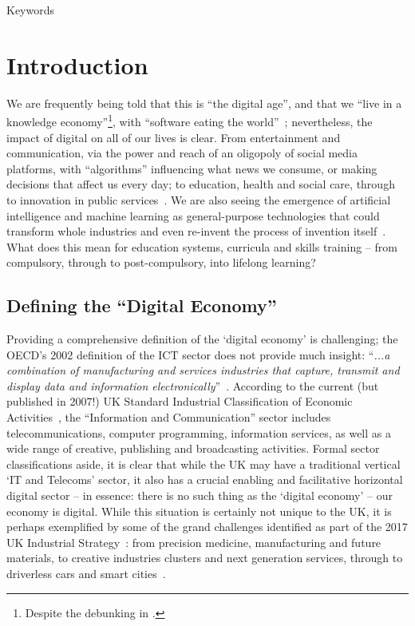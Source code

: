 \documentclass[conference]{IEEEtran}
\begin{document}
\begin{IEEEkeywords}
Keywords
\end{IEEEkeywords}

\section{Introduction}


We are frequently being told that this is ``the digital age'', and
that we ``live in a knowledge economy''\footnote{Despite the debunking
in \cite{Friesen2008}.}, with ``software eating the
world''~\cite{andreessen:2011}; nevertheless, the impact of digital on
all of our lives is clear. From entertainment and communication, via
the power and reach of an oligopoly of social media platforms, with
``algorithms'' influencing what news we consume, or making decisions
that affect us every day; to education, health and social care,
through to innovation in public services~\cite{ecdsmsuk:2018}. We are
also seeing the emergence of artificial intelligence and machine
learning as general-purpose technologies that could transform whole
industries and even re-invent the process of invention
itself~\cite{brynjolfsson-et-al:2018}. What does this mean for
education systems, curricula and skills training -- from compulsory,
through to post-compulsory, into lifelong learning?

\subsection{Defining the ``Digital Economy''}

Providing a comprehensive definition of the `digital economy' is
challenging; the OECD's 2002 definition of the ICT sector does not
provide much insight: ``{\emph{...a combination of manufacturing and
services industries that capture, transmit and display data and
information electronically}}''~\cite{oecd:2002}.  According to the
current (but published in 2007!) UK Standard Industrial Classification
of Economic Activities~\cite{onssic:2009}, the ``Information and
Communication'' sector includes telecommunications, computer
programming, information services, as well as a wide range of
creative, publishing and broadcasting activities. Formal sector
classifications aside, it is clear that while the UK may have a
traditional vertical `IT and Telecoms' sector, it also has a crucial
enabling and facilitative horizontal digital sector -- in essence:
there is no such thing as the `digital economy' -- our economy is
digital. While this situation is certainly not unique to the UK, it is
perhaps exemplified by some of the grand challenges identified as part
of the 2017 UK Industrial Strategy~\cite{ukis:2017}: from precision
medicine, manufacturing and future materials, to creative industries
clusters and next generation services, through to driverless cars and
smart cities~\cite{tryfonas+crick:petra2018}.
\end{document}
